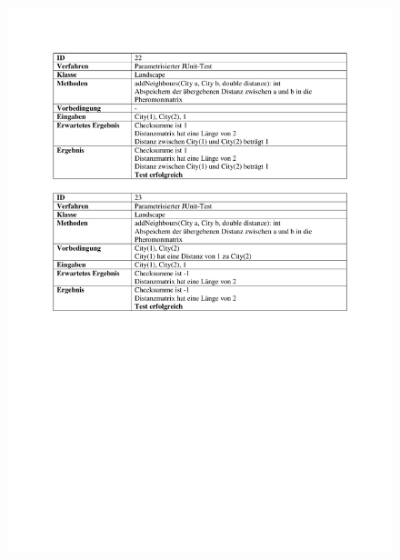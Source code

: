 \begin{appendices}
\begin{figure}[h]
		\includegraphics[width=\linewidth]{images/Testfaelle_Landscape_Seite_2.pdf}
		\label{testLandscape2}
	\end{figure}


\end{appendices}

